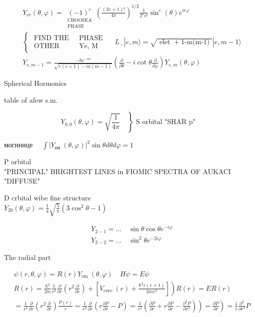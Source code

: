 $$\begin{aligned}
& Y_{e e}(\theta, \varphi)=\underset{\substack{\text { CHOOSEA } \\
\text { PHASE }}}{(-1)^{e}}\left(\frac{(2 e+1)!}{4 \pi}\right)^{1 / 2} \frac{1}{2^{e} e!} \sin ^{e}(\theta) e^{i e \varphi} \\
& \left\{\begin{array}{ll}
\text { FIND THE } & \text { PHASE } \\
\text { OTHER } & \text { Ye, M }
\end{array} \quad L_{-}|e, m\rangle=\sqrt{\text { elet }+1 \text {-m(m-1) }}|e, m-1\rangle\right. \\
& Y_{e, m-1}=\frac{-\hbar e^{-i \phi}}{\sqrt{e(e+1)-m(m-1)}}\left(\frac{\partial}{\partial \theta}-i \cot \theta \frac{\partial}{\partial \varphi}\right) Y_{e, m}(\theta, \varphi)
\end{aligned}
$$

Spherical Hormonics

table of afew s.m.

$$
\left.Y_{0,0}(\theta, \varphi)=\sqrt{\frac{1}{4 \pi}} \quad\right\} \text { S orbital "SHAR p" }
$$

могинице $\quad \int\left|Y_{\text {ем }}(\theta, \varphi)\right|^{2} \sin \theta d \theta d \varphi=1$

P orbital\\
"PRINCIPAL" BRIGHTEST LINES in FIOMIC SPECTRA OF AUKACI "DIFFUSE"

D crbital wibe fine structure\\
$Y_{20}(\theta, \varphi)=\frac{1}{4} \sqrt{\frac{5}{\pi}}\left(3 \cos ^{2} \theta-1\right)$

$$
\begin{aligned}
& Y_{2-1}=\ldots \quad \sin \theta \cos \theta e^{-i \varphi} \\
& Y_{2-2}=\ldots \quad \sin ^{2} \theta e^{-2 i \varphi}
\end{aligned}
$$

The radial part

$$
\begin{aligned}
& \psi(r, \theta, \varphi)=R(r) Y_{\text {em }}(\theta, \varphi) \quad H \psi=E \psi \\
& \left.R(r)=\frac{\hbar^{2}}{2 m} \frac{1}{r^{2}} \frac{\partial}{\partial r}\left(r^{2} \frac{\partial}{\partial r}\right)+\left[V_{\text {core }}(r)+\frac{\hbar^{2} e(e+1)}{2 m r^{2}}\right]\right) R(r)=E R(r) \\
& \left.\left.=\frac{1}{r^{2}} \frac{\partial}{\partial r}\left(r^{2} \frac{\partial}{\partial r}\right) \frac{P(r)}{r}=\frac{1}{r^{2}} \frac{\partial}{\partial r}\left(r \frac{\partial P}{\partial r}-P\right)=\frac{1}{r^{2}}\left(\frac{\partial P}{\partial r}+r \frac{\partial P}{\partial r}-\frac{\partial^{2} P}{\partial r^{2}}\right)\right)=\frac{\partial P}{\partial r}\right)=\frac{1}{r} \frac{\partial^{2}}{\partial r^{2}} P
\end{aligned}
$$

